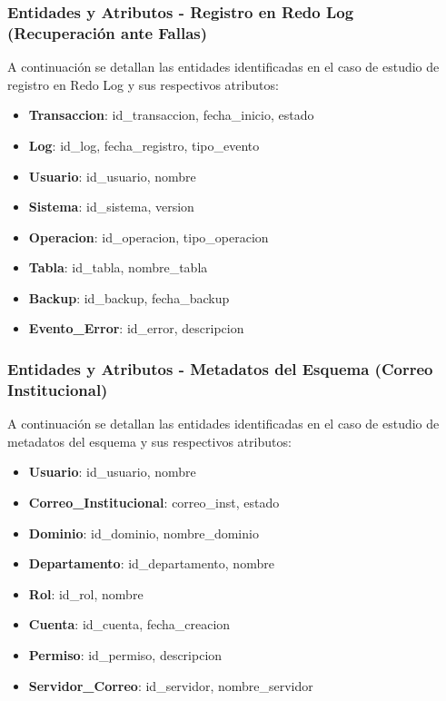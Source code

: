 \documentclass{article}
\begin{document}
\subsubsection{Entidades y Atributos - Registro en Redo Log (Recuperación ante Fallas)}

A continuación se detallan las entidades identificadas en el caso de estudio de registro en Redo Log y sus respectivos atributos:

\begin{itemize}
    \item \textbf{Transaccion}: id\_transaccion, fecha\_inicio, estado
    \item \textbf{Log}: id\_log, fecha\_registro, tipo\_evento
    \item \textbf{Usuario}: id\_usuario, nombre
    \item \textbf{Sistema}: id\_sistema, version
    \item \textbf{Operacion}: id\_operacion, tipo\_operacion
    \item \textbf{Tabla}: id\_tabla, nombre\_tabla
    \item \textbf{Backup}: id\_backup, fecha\_backup
    \item \textbf{Evento\_Error}: id\_error, descripcion
\end{itemize}

\subsubsection{Entidades y Atributos - Metadatos del Esquema (Correo Institucional)}

A continuación se detallan las entidades identificadas en el caso de estudio de metadatos del esquema y sus respectivos atributos:

\begin{itemize}
    \item \textbf{Usuario}: id\_usuario, nombre
    \item \textbf{Correo\_Institucional}: correo\_inst, estado
    \item \textbf{Dominio}: id\_dominio, nombre\_dominio
    \item \textbf{Departamento}: id\_departamento, nombre
    \item \textbf{Rol}: id\_rol, nombre
    \item \textbf{Cuenta}: id\_cuenta, fecha\_creacion
    \item \textbf{Permiso}: id\_permiso, descripcion
    \item \textbf{Servidor\_Correo}: id\_servidor, nombre\_servidor
\end{itemize}
\end{document}
